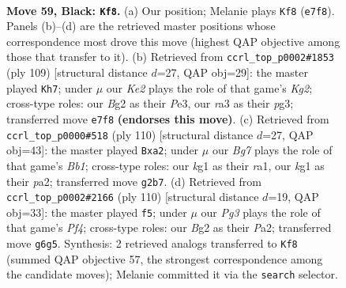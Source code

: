 \documentclass[11pt]{article}
\begin{document}
\clearpage

\begin{figure}[p]\centering
\begin{subfigure}{0.46\textwidth}\centering
\resizebox{\linewidth}{!}{%
\newchessgame
\chessboard[
  setfen={8/4kp2/6p1/1R5P/1P6/R7/1r4b1/6K1 b - - 0 59},
  showmover=false,
  pgfstyle=straightmove, color=movearrow, markmove={e7-f8}
]}
\caption{}
\end{subfigure}\hfill
\begin{subfigure}{0.46\textwidth}\centering
\resizebox{\linewidth}{!}{%
\newchessgame
\chessboard[
  setfen={R7/P5k1/6p1/7p/7P/r3p1P1/4K3/8 b - - 0 55},
  showmover=false,
  pgfstyle=straightmove, color=movearrow, markmove={g7-h7}
]}
\caption{}
\end{subfigure}
\\[4pt]
\begin{subfigure}{0.46\textwidth}\centering
\resizebox{\linewidth}{!}{%
\newchessgame
\chessboard[
  setfen={8/1R3nk1/8/6P1/7P/8/p4PK1/rB6 w - - 0 56},
  showmover=false,
  pgfstyle=straightmove, color=movearrow, markmove={b1-a2}
]}
\caption{}
\end{subfigure}\hfill
\begin{subfigure}{0.46\textwidth}\centering
\resizebox{\linewidth}{!}{%
\newchessgame
\chessboard[
  setfen={8/7k/8/Rpr3p1/5P2/6PK/P7/8 w - - 0 56},
  showmover=false,
  pgfstyle=straightmove, color=movearrow, markmove={f4-f5}
]}
\caption{}
\end{subfigure}
\caption{\textbf{Move 59, Black: \texttt{Kf8}.} (a) Our position; Melanie plays \texttt{Kf8} (\texttt{e7f8}). Panels (b)--(d) are the retrieved master positions whose correspondence most drove this move (highest QAP objective among those that transfer to it). (b) Retrieved from \texttt{ccrl\_top\_p0002\#1853} (ply 109) [structural distance $d$=27, QAP obj=29]: the master played \texttt{Kh7}; under $\mu$ our \emph{Ke2} plays the role of that game's \emph{Kg2}; cross-type roles: our \emph{B}g2 as their \emph{P}e3, our \emph{r}a3 as their \emph{p}g3; transferred move \texttt{e7f8} \textbf{(endorses this move)}. (c) Retrieved from \texttt{ccrl\_top\_p0000\#518} (ply 110) [structural distance $d$=27, QAP obj=43]: the master played \texttt{Bxa2}; under $\mu$ our \emph{Bg7} plays the role of that game's \emph{Bb1}; cross-type roles: our \emph{k}g1 as their \emph{r}a1, our \emph{k}g1 as their \emph{p}a2; transferred move \texttt{g2b7}. (d) Retrieved from \texttt{ccrl\_top\_p0002\#2166} (ply 110) [structural distance $d$=19, QAP obj=33]: the master played \texttt{f5}; under $\mu$ our \emph{Pg3} plays the role of that game's \emph{Pf4}; cross-type roles: our \emph{B}g2 as their \emph{P}a2; transferred move \texttt{g6g5}. Synthesis: 2 retrieved analogs transferred to \texttt{Kf8} (summed QAP objective 57, the strongest correspondence among the candidate moves); Melanie committed it via the \texttt{search} selector.}
\label{fig:thought-m117}
\end{figure}
\end{document}
